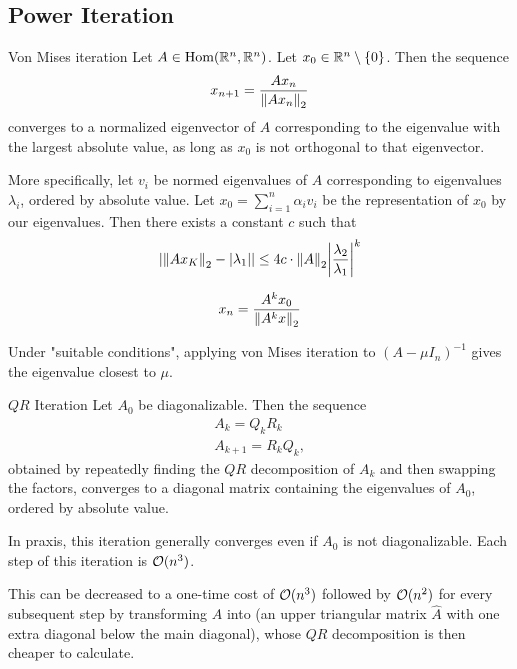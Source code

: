 \subsection{Power Iteration}
\begin{importanttheorem}{Von Mises iteration}{}
	Let $A \in \textnormal{Hom}(\mathbb{R}^n, \mathbb{R}^n)$. Let $x_0 \in \mathbb{R}^n \setminus \qty{0}$. Then the sequence
	\begin{align*}
		x_{n+1} = \frac{Ax_n}{\norm{Ax_n}_2}
	\end{align*}
	converges to a normalized eigenvector of $A$ corresponding to the eigenvalue with the largest absolute value, as long as $x_0$ is not orthogonal to that eigenvector.
	
	More specifically, let $v_i$ be normed eigenvalues of $A$ corresponding to eigenvalues $\lambda_i$, ordered by absolute value. Let $x_0 = \sum_{i = 1}^n \alpha_i v_i$
	be the representation of $x_0$ by our eigenvalues. Then there exists a constant $c$ such that
	\begin{align*}
		\abs{\norm{Ax_K}_2 - \abs{\lambda_1}} \leq 4c \cdot \norm{A}_2 \abs{\frac{\lambda_2}{\lambda_1}}^k
	\end{align*}
\end{importanttheorem}
\begin{proposition}
	\begin{align*}
		x_n = \frac{A^kx_0}{\norm{A^kx}_2}
	\end{align*}
\end{proposition}
\begin{proposition}
	Under "suitable conditions", applying von Mises iteration to $(A - \mu I_n)^{-1}$ gives the eigenvalue closest to $\mu$.
\end{proposition}

\begin{importanttheorem}{$QR$ Iteration}{}
	Let $A_0$ be diagonalizable. Then the sequence
	\begin{align*}
		A_k = Q_kR_k\\
		A_{k+1} = R_kQ_k,
	\end{align*}
	obtained by repeatedly finding the $QR$ decomposition of $A_k$ and then swapping the factors, converges to a diagonal matrix containing the eigenvalues of $A_0$, ordered by absolute value.
\end{importanttheorem}
In praxis, this iteration generally converges even if $A_0$ is not diagonalizable. Each step of this iteration is $\mathcal{O}(n^3)$.

This can be decreased to a one-time cost of $\mathcal{O}(n^3)$ followed by $\mathcal{O}(n^2)$ for every subsequent step by transforming $A$ into  (an upper triangular matrix $\hat A$ with one extra diagonal below the main diagonal), whose $QR$ decomposition is then cheaper to calculate.
